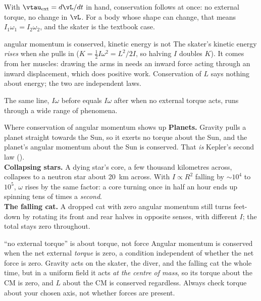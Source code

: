 With $\vtau_{\text{ext}}=d\vL/dt$ in hand, conservation follows at once: no external torque, no change in
$\vL$. For a body whose shape can change, that means $I_1\omega_1=I_2\omega_2$, and the skater is the
textbook case.

\begin{figure}[htbp]
\centering
{}
\end{figure}

\begin{trapbox}{angular momentum is conserved, kinetic energy is not}
The skater's kinetic energy \emph{rises} when she pulls in ($K=\tfrac{1}{2}I\omega^2=L^2/2I$, so halving
$I$ doubles $K$). It comes from her muscles: drawing the arms in needs an inward force acting through an
inward displacement, which does positive work. Conservation of $L$ says nothing about energy; the two are
independent laws.
\end{trapbox}

The same line, $I\omega$ before equals $I\omega$ after when no external torque acts, runs through a wide range of phenomena.

\begin{remarkbox}{Where conservation of angular momentum shows up}
\textbf{Planets.} Gravity pulls a planet straight towards the Sun, so it exerts no torque about the Sun,
and the planet's angular momentum about the Sun is conserved. That \emph{is} Kepler's second law
().\\[3pt]
\textbf{Collapsing stars.} A dying star's core, a few thousand kilometres across, collapses to a neutron
star about \SI{20}{km} across. With $I\propto R^2$ falling by $\sim10^4$ to $10^5$, $\omega$ rises by the
same factor: a core turning once in half an hour ends up spinning tens of times a \emph{second}.\\[3pt]
\textbf{The falling cat.} A dropped cat with zero angular momentum still turns feet-down by rotating its
front and rear halves in opposite senses, with different $I$; the total stays zero throughout.
\end{remarkbox}

\begin{trapbox}{``no external torque'' is about torque, not force}
Angular momentum is conserved when the net external \emph{torque} is zero, a condition independent of
whether the net force is zero. Gravity acts on the skater, the diver, and the falling cat the whole time,
but in a uniform field it acts \emph{at the centre of mass}, so its torque about the CM is zero, and $L$
about the CM is conserved regardless. Always check torque about your chosen axis, not whether forces are
present.
\end{trapbox}

